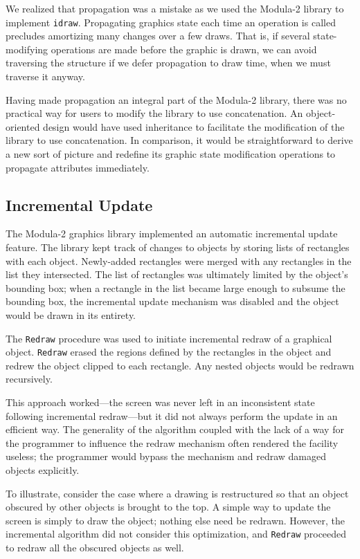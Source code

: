 We realized that propagation was a mistake as we used the \mbox{Modula-2}
library to implement {\tt idraw}.  Propagating graphics state each time an
operation is called precludes amortizing many changes over a few draws.
That is, if several state-modifying operations are made before the graphic
is drawn, we can avoid traversing the structure if we defer propagation to
draw time, when we must traverse it anyway.

Having made propagation an integral part of the \mbox{Modula-2} library,
there was no practical way for users to modify the library
to use concatenation.
An object-oriented design would have used inheritance to facilitate the
modification of the library to use concatenation.  In comparison, it would
be straightforward to derive a new sort of picture and redefine its graphic
state modification operations to propagate attributes immediately.

\subsection{Incremental Update}

The \mbox{Modula-2} graphics library implemented an automatic
incremental update feature.  The library kept track of changes to
objects by storing lists of rectangles with each object.  
Newly-added rectangles 
were merged with any rectangles in the list they intersected.
The list of rectangles was ultimately limited by the object's
bounding box; when a rectangle in the list became large enough to subsume
the bounding box, the incremental update mechanism was disabled and the
object would be drawn in its entirety.

The {\tt Redraw} procedure was used to initiate incremental
redraw of a graphical object.  {\tt Redraw} erased the
regions defined by the rectangles in the object and redrew the object clipped
to each rectangle.  Any nested objects would be redrawn recursively.

This approach worked---the screen was never left in an inconsistent state
following incremental redraw---but it did not always perform the update in
an efficient way.  The generality of the algorithm coupled with the lack of
a way for the programmer to influence the redraw mechanism often rendered
the facility useless; the programmer would bypass the mechanism and
redraw damaged objects explicitly.

To illustrate, consider the case where a drawing is restructured so that an
object obscured by other objects is brought to the top.  A simple
way to update the screen is simply to draw the object; nothing else need be
redrawn.  However, the incremental algorithm did not consider this
optimization, and {\tt Redraw} proceeded to redraw all the obscured objects as
well.  

